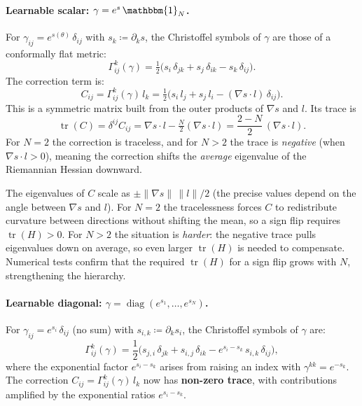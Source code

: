 \documentclass{article}
\newcommand{\Id}{\mathbbm{1}}
\begin{document}
\paragraph{Learnable scalar: $\gamma = e^s\,\Id_N$.}
For $\gamma_{ij} = e^{s(\theta)}\,\delta_{ij}$ with
$s_k \coloneqq \partial_k s$,
the Christoffel symbols of $\gamma$ are those of a conformally flat metric:
\begin{equation}
    \Gamma^k_{ij}(\gamma)
    = \tfrac{1}{2}\bigl(s_i\,\delta_{jk} + s_j\,\delta_{ik}
    - s_k\,\delta_{ij}\bigr).
\end{equation}
The correction term is:
\begin{equation}\label{eq:scalar-correction}
    C_{ij}
    = \Gamma^k_{ij}(\gamma)\,l_k
    = \tfrac{1}{2}\bigl(s_i\,l_j + s_j\,l_i
    - (\nabla s \cdot l)\,\delta_{ij}\bigr).
\end{equation}
This is a symmetric matrix built from the outer products of
$\nabla s$ and $l$.
Its trace is
\begin{equation}\label{eq:scalar-trace}
    \operatorname{tr}(C)
    = \delta^{ij}C_{ij}
    = \nabla s\cdot l - \tfrac{N}{2}(\nabla s\cdot l)
    = \frac{2-N}{2}\,(\nabla s \cdot l).
\end{equation}
For $N=2$ the correction is traceless, and for $N>2$ the trace is
\emph{negative} (when $\nabla s\cdot l > 0$),
meaning the correction shifts the \emph{average} eigenvalue of the
Riemannian Hessian downward.

The eigenvalues of $C$ scale as $\pm\|\nabla s\|\,\|l\|/2$
(the precise values depend on the angle between $\nabla s$ and $l$).
For $N=2$ the tracelessness forces $C$ to redistribute curvature
between directions without shifting the mean,
so a sign flip requires $\operatorname{tr}(H) > 0$.
For $N>2$ the situation is \emph{harder}: the negative trace pulls
eigenvalues down on average, so even larger $\operatorname{tr}(H)$
is needed to compensate.
Numerical tests confirm that the required $\operatorname{tr}(H)$
for a sign flip grows with $N$, strengthening the hierarchy.

\paragraph{Learnable diagonal: $\gamma = \operatorname{diag}(e^{s_1},\ldots,e^{s_N})$.}
For $\gamma_{ij} = e^{s_i}\,\delta_{ij}$ (no sum) with
$s_{i,k} \coloneqq \partial_k s_i$,
the Christoffel symbols of $\gamma$ are:
\begin{equation}
    \Gamma^k_{ij}(\gamma)
    = \frac{1}{2}\bigl(
      s_{j,i}\,\delta_{jk} + s_{i,j}\,\delta_{ik}
    - e^{s_i - s_k}\,s_{i,k}\,\delta_{ij}\bigr),
\end{equation}
where the exponential factor $e^{s_i - s_k}$ arises from
raising an index with $\gamma^{kk} = e^{-s_k}$.
The correction $C_{ij} = \Gamma^k_{ij}(\gamma)\,l_k$ now has
\textbf{non-zero trace}, with contributions amplified by the
exponential ratios $e^{s_i - s_k}$.
\end{document}

